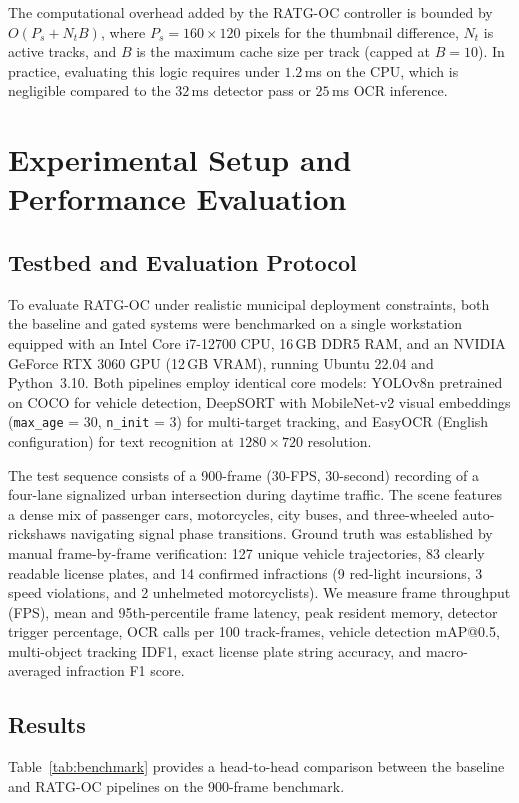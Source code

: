The computational overhead added by the RATG-OC controller is bounded by $O(P_s + N_t B)$, where $P_s = 160 \times 120$ pixels for the thumbnail difference, $N_t$ is active tracks, and $B$ is the maximum cache size per track (capped at $B=10$). In practice, evaluating this logic requires under $1.2$\,ms on the CPU, which is negligible compared to the $32$\,ms detector pass or $25$\,ms OCR inference.

\section{Experimental Setup and Performance Evaluation}
\subsection{Testbed and Evaluation Protocol}
To evaluate RATG-OC under realistic municipal deployment constraints, both the baseline and gated systems were benchmarked on a single workstation equipped with an Intel Core i7-12700 CPU, 16\,GB DDR5 RAM, and an NVIDIA GeForce RTX 3060 GPU (12\,GB VRAM), running Ubuntu 22.04 and Python~3.10. Both pipelines employ identical core models: YOLOv8n pretrained on COCO for vehicle detection, DeepSORT with MobileNet-v2 visual embeddings (\texttt{max\_age} = 30, \texttt{n\_init} = 3) for multi-target tracking, and EasyOCR (English configuration) for text recognition at $1280{\times}720$ resolution.

The test sequence consists of a 900-frame (30-FPS, 30-second) recording of a four-lane signalized urban intersection during daytime traffic. The scene features a dense mix of passenger cars, motorcycles, city buses, and three-wheeled auto-rickshaws navigating signal phase transitions. Ground truth was established by manual frame-by-frame verification: 127 unique vehicle trajectories, 83 clearly readable license plates, and 14 confirmed infractions (9 red-light incursions, 3 speed violations, and 2 unhelmeted motorcyclists). We measure frame throughput (FPS), mean and 95th-percentile frame latency, peak resident memory, detector trigger percentage, OCR calls per 100 track-frames, vehicle detection mAP@0.5, multi-object tracking IDF1, exact license plate string accuracy, and macro-averaged infraction F1 score.

\subsection{Results}
Table~\ref{tab:benchmark} provides a head-to-head comparison between the baseline and RATG-OC pipelines on the 900-frame benchmark.

